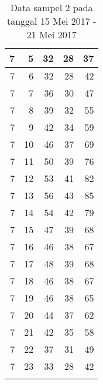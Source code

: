 \begin{longtable}{|r|r|r|r|r|}
    7     & 5     & 32    & 28    & 37 \\\hline
    7     & 6     & 32    & 28    & 42 \\\hline
    7     & 7     & 36    & 30    & 47 \\\hline
    7     & 8     & 39    & 32    & 55 \\\hline
    7     & 9     & 42    & 34    & 59 \\\hline
    7     & 10    & 46    & 37    & 69 \\\hline
    7     & 11    & 50    & 39    & 76 \\\hline
    7     & 12    & 53    & 41    & 82 \\\hline
    7     & 13    & 56    & 43    & 85 \\\hline
    7     & 14    & 54    & 42    & 79 \\\hline
    7     & 15    & 47    & 39    & 68 \\\hline
    7     & 16    & 46    & 38    & 67 \\\hline
    7     & 17    & 48    & 39    & 68 \\\hline
    7     & 18    & 46    & 38    & 67 \\\hline
    7     & 19    & 46    & 38    & 65 \\\hline
    7     & 20    & 44    & 37    & 62 \\\hline
    7     & 21    & 42    & 35    & 58 \\\hline
    7     & 22    & 37    & 31    & 49 \\\hline
    7     & 23    & 33    & 28    & 42 \\\hline
  \caption{Data sampel 2 pada tanggal 15 Mei 2017 - 21 Mei 2017}
  \label{tab:datasample215052017}%
\end{longtable}%

